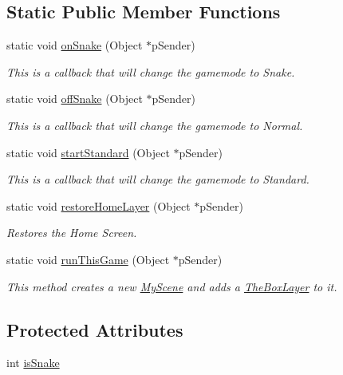 \subsection*{\-Static \-Public \-Member \-Functions}
\begin{DoxyCompactItemize}
\item 
static void \hyperlink{class_the_box_layer_a91e48a9efb07ed70fac3e1880934cf37}{on\-Snake} (\-Object $\ast$p\-Sender)
\begin{DoxyCompactList}\small\item\em \-This is a callback that will change the gamemode to \-Snake. \end{DoxyCompactList}\item 
static void \hyperlink{class_the_box_layer_ae03788f405b053b85e230804d7a88904}{off\-Snake} (\-Object $\ast$p\-Sender)
\begin{DoxyCompactList}\small\item\em \-This is a callback that will change the gamemode to \-Normal. \end{DoxyCompactList}\item 
static void \hyperlink{class_the_box_layer_a3e32611fa82942d00d5e561bc59251e9}{start\-Standard} (\-Object $\ast$p\-Sender)
\begin{DoxyCompactList}\small\item\em \-This is a callback that will change the gamemode to \-Standard. \end{DoxyCompactList}\item 
static void \hyperlink{class_the_box_layer_af670f77242c15a7de84d6658cddb7056}{restore\-Home\-Layer} (\-Object $\ast$p\-Sender)
\begin{DoxyCompactList}\small\item\em \-Restores the \-Home \-Screen. \end{DoxyCompactList}\item 
static void \hyperlink{class_the_box_layer_a3acdbe7193e4da946ba01f80daa951ad}{run\-This\-Game} (\-Object $\ast$p\-Sender)
\begin{DoxyCompactList}\small\item\em \-This method creates a new \hyperlink{class_my_scene}{\-My\-Scene} and adds a \hyperlink{class_the_box_layer}{\-The\-Box\-Layer} to it. \end{DoxyCompactList}\end{DoxyCompactItemize}
\subsection*{\-Protected \-Attributes}
\begin{DoxyCompactItemize}
\item 
int \hyperlink{class_the_box_layer_ad8d6cd2fd5690312bfdbd4049a43f2f5}{is\-Snake}
\end{DoxyCompactItemize}


